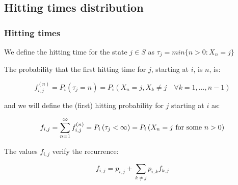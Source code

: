 \subsection{Hitting times distribution}
 \begin{frame}\frametitle{Hitting times}
    \vspace{4em}
    
    \begin{definition}
    We define the hitting time for the state \(j \in S\) as 
    $\tau_j = min \{n > 0 : X_n = j \}$
    \end{definition}
    
    \begin{definition}
    The probability that the first hitting time for $j$, starting at $i$, is $n$, is:

    \[
    f_{i,j}^{(n)} = P_i\left(\tau_j = n\right) = P_i\left(X_n = j, X_k \neq j \quad \forall k = 1, \ldots, n - 1 \right)
    \]

    and we will define the (first) hitting probability for \(j\) starting at \(i\) as:

    \[
    f_{i, j} = \sum_{n = 1}^{\infty} f_{i,j}^{(n)} = P_i\left(\tau_j < \infty\right) =
    P_i\left({X_n = j \textrm{ for some } n > 0}\right)
    \]
    \end{definition}
    
    The values $f_{i, j}$ verify the recurrence:

    \[
    f_{i,j} = p_{i,j} + \sum_{k\neq j} p_{i,k} f_{k,j}
    \]
 \end{frame}
 
